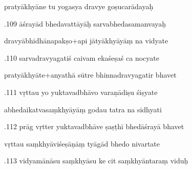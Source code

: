 \documentclass[article,12pt,a4paper]{memoir}%
\newcounter{parCount}
\begin{document}
	  
	  \pstart \leavevmode%
	pratyākhyāne tu yogasya dravye goṣucarādayaḥ 
	{}
	\pend%
      

	  
	  \pstart {}.109 āśrayād bhedavattāyāḥ sarvabhedasamanvayaḥ 
	{}
	\pend%
      

	  
	  \pstart \leavevmode%
	dravyābhidhānapakṣo+api jātyākhyāyāṃ na vidyate 
	{}
	\pend%
      

	  
	  \pstart {}.110 sarvadravyagatiś caivam ekaśeṣaś ca nocyate 
	{}
	\pend%
      

	  
	  \pstart \leavevmode%
	pratyākhyāte+anyathā sūtre bhinnadravyagatir bhavet 
	{}
	\pend%
      

	  
	  \pstart {}.111 vṛttau yo yuktavadbhāvo varaṇādiṣu śiṣyate 
	{}
	\pend%
      

	  
	  \pstart \leavevmode%
	abhedaikatvasaṃkhyāyāṃ godau tatra na sidhyati 
	{}
	\pend%
      

	  
	  \pstart {}.112 prāg vṛtter yuktavadbhāve ṣaṣṭhī bhedāśrayā bhavet 
	{}
	\pend%
      

	  
	  \pstart \leavevmode%
	vṛttau saṃkhyāviśeṣāṇāṃ tyāgād bhedo nivartate 
	{}
	\pend%
      

	  
	  \pstart {}.113 vidyamānāsu saṃkhyāsu ke cit saṃkhyāntaraṃ viduḥ 
	{}
	\pend%
      
\end{document}

